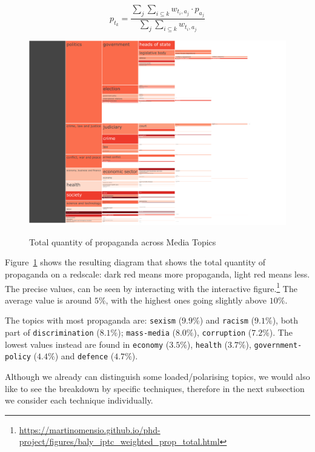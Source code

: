 $$ p_{t_{k}} = \frac{ \sum_{j} \sum_{i\subseteq k} w_{t_{i},a_{j}} \cdot p_{a_{j}} }{ \sum_{j} \sum_{i\subseteq k} w_{t_{i},a_{j}} } $$

\begin{figure}[!htbp]
    \centering
    \href{https://martinomensio.github.io/phd-project/figures/baly_iptc_weighted_prop_total.html}{\includegraphics[trim={2.65cm 0cm 2.8cm 0cm},clip,width=\linewidth]{figures/baly_iptc_weighted_prop_total.pdf}}
    \caption{Total quantity of propaganda across Media Topics}
    \label{fig:baly_iptc_weighted_prop_total}
\end{figure}

Figure~\ref{fig:baly_iptc_weighted_prop_total}
shows the resulting diagram that shows the total quantity of propaganda on a redscale: dark red means more propaganda, light red means less.
The precise values, can be seen by interacting with the interactive figure.\footnote{\url{https://martinomensio.github.io/phd-project/figures/baly_iptc_weighted_prop_total.html}}
The average value is around $5\%$, with the highest ones going slightly above $10\%$.

The topics with most propaganda are: \texttt{sexism} ($9.9\%$) and \texttt{racism} ($9.1\%$), both part of \texttt{discrimination} ($8.1\%$); \texttt{mass-media} ($8.0\%$), \texttt{corruption} ($7.2\%$). The lowest values instead are found in \texttt{economy} ($3.5\%$), \texttt{health} ($3.7\%$), \texttt{government-policy} ($4.4\%$) and \texttt{defence} ($4.7\%$).

Although we already can distinguish some loaded/polarising topics, we would also like to see the breakdown by specific techniques, therefore in the next subsection we consider each technique individually.

